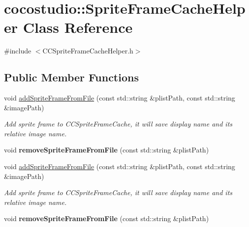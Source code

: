 \hypertarget{classcocostudio_1_1SpriteFrameCacheHelper}{}\section{cocostudio\+:\+:Sprite\+Frame\+Cache\+Helper Class Reference}
\label{classcocostudio_1_1SpriteFrameCacheHelper}


{\ttfamily \#include $<$C\+C\+Sprite\+Frame\+Cache\+Helper.\+h$>$}

\subsection*{Public Member Functions}
\begin{DoxyCompactItemize}
\item 
\mbox{\label{classcocostudio_1_1SpriteFrameCacheHelper_a5fc069c831dc5063ecc3247a319db950}} 
void \hyperlink{classcocostudio_1_1SpriteFrameCacheHelper_a5fc069c831dc5063ecc3247a319db950}{add\+Sprite\+Frame\+From\+File} (const std\+::string \&plist\+Path, const std\+::string \&image\+Path)
\begin{DoxyCompactList}\small\item\em Add sprite frame to C\+C\+Sprite\+Frame\+Cache, it will save display name and it\textquotesingle{}s relative image name. \end{DoxyCompactList}\item 
\mbox{\label{classcocostudio_1_1SpriteFrameCacheHelper_ae30f39e2fca9248c65beade02f05a4bf}} 
void {\bfseries remove\+Sprite\+Frame\+From\+File} (const std\+::string \&plist\+Path)
\item 
\mbox{\label{classcocostudio_1_1SpriteFrameCacheHelper_a5fc069c831dc5063ecc3247a319db950}} 
void \hyperlink{classcocostudio_1_1SpriteFrameCacheHelper_a5fc069c831dc5063ecc3247a319db950}{add\+Sprite\+Frame\+From\+File} (const std\+::string \&plist\+Path, const std\+::string \&image\+Path)
\begin{DoxyCompactList}\small\item\em Add sprite frame to C\+C\+Sprite\+Frame\+Cache, it will save display name and it\textquotesingle{}s relative image name. \end{DoxyCompactList}\item 
\mbox{\label{classcocostudio_1_1SpriteFrameCacheHelper_ae30f39e2fca9248c65beade02f05a4bf}} 
void {\bfseries remove\+Sprite\+Frame\+From\+File} (const std\+::string \&plist\+Path)
\end{DoxyCompactItemize}

